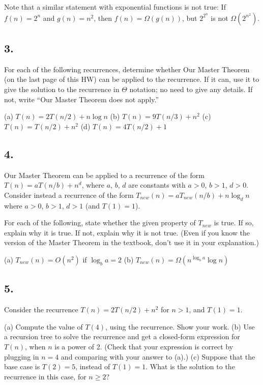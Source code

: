 \documentclass{article}
\begin{document}
Note that a similar statement with exponential functions is not true: If $f(n) = 2^n$ and $g(n) = n^2$, then $f(n) = \Omega(g(n))$, but $2^{2^n}$ is not $\Omega(2^{n^2})$.


\subsection*{3.}
For each of the following recurrences, determine whether Our Master Theorem (on the last page of this HW) can be applied to the recurrence. If it can, use it to give the solution to the recurrence in $\Theta$ notation; no need to give any details. If not, write “Our Master Theorem does not apply.”

(a) $T(n) = 2T(n/2) + n \log n$
(b) $T(n) = 9T(n/3) + n^2$
(c) $T(n) = T(n/2) + n^2$
(d) $T(n) = 4T(n/2) + 1$


\subsection*{4.}
Our Master Theorem can be applied to a recurrence of the form $T(n) = aT(n/b) + n^d$, where $a$, $b$, $d$ are constants with $a > 0$, $b > 1$, $d > 0$. Consider instead a recurrence of the form $T_{new}(n) = aT_{new}(n/b) + n \log_d n$ where $a > 0$, $b > 1$, $d > 1$ (and $T(1) = 1$).

For each of the following, state whether the given property of $T_{new}$ is true. If so, explain why it is true. If not, explain why it is not true. (Even if you know the version of the Master Theorem in the textbook, don’t use it in your explanation.)

(a) $T_{new}(n) = O(n^2)$ if $\log_b a = 2$
(b) $T_{new}(n) = \Omega(n^{\log_b a} \log n)$


\subsection*{5.}
Consider the recurrence $T(n) = 2T(n/2) + n^2$ for $n > 1$, and $T(1) = 1$.

(a) Compute the value of $T(4)$, using the recurrence. Show your work.
(b) Use a recursion tree to solve the recurrence and get a closed-form expression for $T(n)$, when $n$ is a power of 2. (Check that your expression is correct by plugging in $n = 4$ and comparing with your answer to (a).)
(c) Suppose that the base case is $T(2) = 5$, instead of $T(1) = 1$. What is the solution to the recurrence in this case, for $n \ge 2$?
\end{document}
